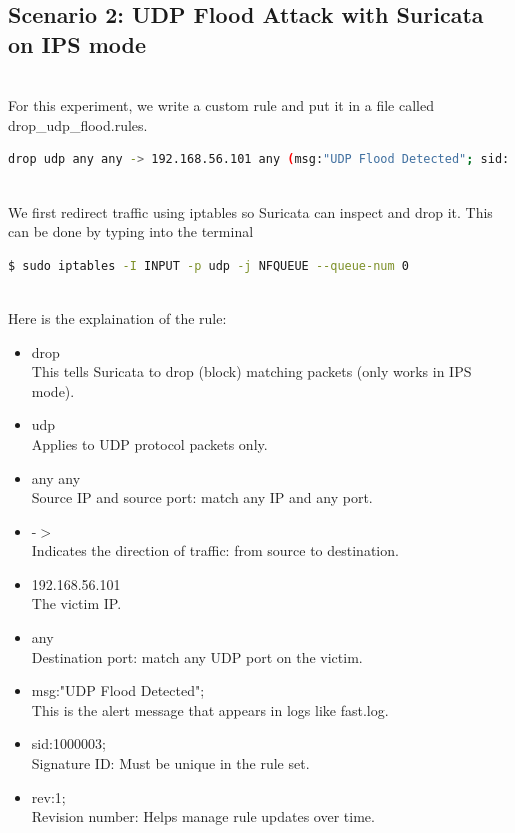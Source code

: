 \subsection{Scenario 2: UDP Flood Attack with Suricata on IPS mode}
\\
For this experiment, we write a custom rule and put it in a file called drop\_udp\_flood.rules.
\begin{lstlisting}[language=bash,caption={Content of drop\_udp\_flood.rules}]
drop udp any any -> 192.168.56.101 any (msg:"UDP Flood Detected"; sid: 1000003; rev:1;)  
\end{lstlisting}
\\
We first redirect traffic using iptables so Suricata can inspect and drop it. This can be done by typing into the terminal
\begin{lstlisting}[language=bash,caption={Set iptables to redirect packets to NFQUEUE}]
$ sudo iptables -I INPUT -p udp -j NFQUEUE --queue-num 0
\end{lstlisting}
\\
Here is the explaination of the rule:
\begin{itemize}
\item drop \\
This tells Suricata to drop (block) matching packets (only works in IPS mode).
\item udp \\
Applies to UDP protocol packets only.
\item any any \\
Source IP and source port: match any IP and any port.
\item -$>$ \\
Indicates the direction of traffic: from source to destination.
\item 192.168.56.101 \\
The victim IP.
\item any \\
Destination port: match any UDP port on the victim.
\item msg:"UDP Flood Detected"; \\
This is the alert message that appears in logs like fast.log.
\item sid:1000003; \\
Signature ID: Must be unique in the rule set.
\item rev:1; \\
Revision number: Helps manage rule updates over time.
\end{itemize}
\\
